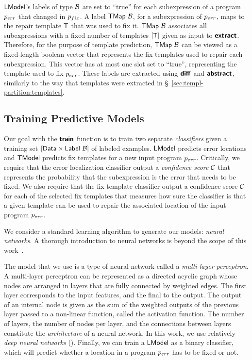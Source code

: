 $\mathsf{LModel}$'s labels of type $\mathcal{B}$ are set to ``true'' for each subexpression
of a program $p_{err}$ that changed in $p_{fix}$. A label $\mathsf{TMap}\ \mathcal{B}$, for a
subexpression of $p_{err}$, maps to the repair template $\mathsf{T}$ that was used to fix
it. $\mathsf{TMap}\ \mathcal{B}$ associates all subexpressions with a fixed number of
templates $[\mathsf{T}]$ given as input to $\bm{\mathsf{extract}}$. Therefore, for the
purpose of template prediction, $\mathsf{TMap}\ \mathcal{B}$ can be viewed as a
fixed-length boolean vector that represents the fix templates used to repair
each subexpression. This vector has at most one slot set to ``true'',
representing the template used to fix $p_{err}$. These labels are extracted using
$\bm{\mathsf{diff}}$ and $\bm{\mathsf{abstract}}$, similarly to the way that templates were extracted
in \S~\ref{sec:templ-partition:templates}.


\subsection{Training Predictive Models}
\label{sec:templ-pred:train}
\lstDeleteShortInline{|} %

Our goal with the $\bm{\mathsf{train}}$ function is to train two separate
\emph{classifiers} given a training set $[\mathsf{Data} \times
\mathsf{Label}\ \mathcal{B}]$ of labeled examples. $\mathsf{LModel}$ predicts error locations and
$\mathsf{TModel}$ predicts fix templates for a new input program $p_{err}$. Critically, we
require that the error localization classifier output a \emph{confidence score}
$\mathcal{C}$ that represents the probability that the subexpression is the error that
needs to be fixed. We also require that the fix template classifier output a
confidence score $\mathcal{C}$ for each of the selected fix templates that measures
how sure the classifier is that a given template can be used to repair the
associated location of the input program $p_{err}$.

We consider a standard learning algorithm to generate our models: \emph{neural
networks}. A thorough introduction to neural networks is
beyond the scope of this work~\citep{Hastie2009-bn,Nielsen2015-pu}.

The model that we use is a type of neural network called a \emph{multi-layer
perceptron}. A multi-layer perceptron can be represented as a directed acyclic
graph whose nodes are arranged in layers that are fully connected by weighted
edges. The first layer corresponds to the input features, and the final to the
output. The output of an internal node is given as the sum of the weighted
outputs of the previous layer passed to a non-linear function, called the
activation function. The number of layers,
the number of nodes per layer, and the connections between layers constitute the
\emph{architecture} of a neural network. In this work, we use relatively
\emph{deep neural networks} (\dnn). Finally, we can train a \dnn $\mathsf{LModel}$ as a
binary classifier, which will predict whether a location in a program $p_{err}$
has to be fixed or not.

